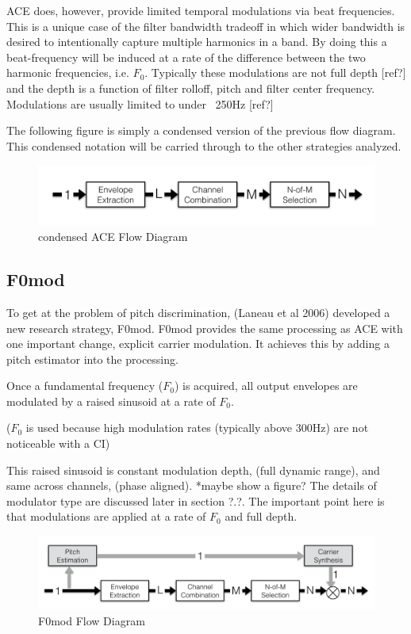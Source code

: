 \documentclass [11pt, proquest] {uwthesis}[2015/03/03]
\begin{document}
ACE does, however, provide limited temporal modulations via beat frequencies.  This is a unique case of the filter bandwidth tradeoff in which wider bandwidth is desired to intentionally capture multiple harmonics in a band.  By doing this a beat-frequency will be induced at a rate of the difference between the two harmonic frequencies, i.e. $F_0$.  Typically these modulations are not full depth [ref?] and the depth is a function of filter rolloff, pitch and filter center frequency.  Modulations are usually limited to under ~250Hz [ref?]

The following figure is simply a condensed version of the previous flow diagram.  This condensed notation will be carried through to the other strategies analyzed.

\begin{figure}[!ht]
  \centering
    \includegraphics[width=1\textwidth]{ACE_flow_diagramTEMP}   
    \caption{condensed ACE Flow Diagram}
\end{figure}

\subsection{F0mod}

To get at the problem of pitch discrimination, (Laneau et al 2006) developed a new research strategy, F0mod.  F0mod provides the same processing as ACE with one important change, explicit carrier modulation.  It achieves this by adding a pitch estimator into the processing.

Once a fundamental frequency ($F_0$) is acquired, all output envelopes are modulated by a raised sinusoid at a rate of $F_0$.  

($F_0$ is used because high modulation rates (typically above 300Hz) are not noticeable with a CI)

This raised sinusoid is constant modulation depth, (full dynamic range), and same across channels, (phase aligned).  *maybe show a figure?  The details of modulator type are discussed later in section ?.?.  The important point here is that modulations are applied at a rate of $F_0$ and full depth.

\begin{figure}[!ht]
  \centering
    \includegraphics[width=1\textwidth]{F0mod_flow_diagramTEMP}   
    \caption{F0mod Flow Diagram}
\end{figure}
\end{document}
